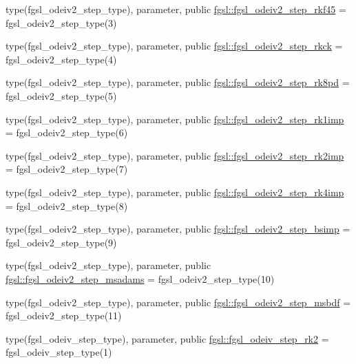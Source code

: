 \begin{DoxyCompactItemize}
\item 
type(fgsl\+\_\+odeiv2\+\_\+step\+\_\+type), parameter, public \hyperlink{namespacefgsl_a9ddf77505b3bd58dea1832c7d57cb566}{fgsl\+::fgsl\+\_\+odeiv2\+\_\+step\+\_\+rkf45} = fgsl\+\_\+odeiv2\+\_\+step\+\_\+type(3)
\item 
type(fgsl\+\_\+odeiv2\+\_\+step\+\_\+type), parameter, public \hyperlink{namespacefgsl_a18b4edbca94c0c9d60fbadc94d1d4964}{fgsl\+::fgsl\+\_\+odeiv2\+\_\+step\+\_\+rkck} = fgsl\+\_\+odeiv2\+\_\+step\+\_\+type(4)
\item 
type(fgsl\+\_\+odeiv2\+\_\+step\+\_\+type), parameter, public \hyperlink{namespacefgsl_aa7c82f7503be3be3ab81991a3e8eb719}{fgsl\+::fgsl\+\_\+odeiv2\+\_\+step\+\_\+rk8pd} = fgsl\+\_\+odeiv2\+\_\+step\+\_\+type(5)
\item 
type(fgsl\+\_\+odeiv2\+\_\+step\+\_\+type), parameter, public \hyperlink{namespacefgsl_ae903b3c5e98a84868123fcf7f45cdf11}{fgsl\+::fgsl\+\_\+odeiv2\+\_\+step\+\_\+rk1imp} = fgsl\+\_\+odeiv2\+\_\+step\+\_\+type(6)
\item 
type(fgsl\+\_\+odeiv2\+\_\+step\+\_\+type), parameter, public \hyperlink{namespacefgsl_a7b4cc51dc91d507009b26f542f372bbd}{fgsl\+::fgsl\+\_\+odeiv2\+\_\+step\+\_\+rk2imp} = fgsl\+\_\+odeiv2\+\_\+step\+\_\+type(7)
\item 
type(fgsl\+\_\+odeiv2\+\_\+step\+\_\+type), parameter, public \hyperlink{namespacefgsl_ac791c6691e1ebeae5e10c234a26737df}{fgsl\+::fgsl\+\_\+odeiv2\+\_\+step\+\_\+rk4imp} = fgsl\+\_\+odeiv2\+\_\+step\+\_\+type(8)
\item 
type(fgsl\+\_\+odeiv2\+\_\+step\+\_\+type), parameter, public \hyperlink{namespacefgsl_a6c2cfecdf8c9901ed22feb4c9fdef384}{fgsl\+::fgsl\+\_\+odeiv2\+\_\+step\+\_\+bsimp} = fgsl\+\_\+odeiv2\+\_\+step\+\_\+type(9)
\item 
type(fgsl\+\_\+odeiv2\+\_\+step\+\_\+type), parameter, public \hyperlink{namespacefgsl_a2cdba04e438cd75d8a78612215dcc5bc}{fgsl\+::fgsl\+\_\+odeiv2\+\_\+step\+\_\+msadams} = fgsl\+\_\+odeiv2\+\_\+step\+\_\+type(10)
\item 
type(fgsl\+\_\+odeiv2\+\_\+step\+\_\+type), parameter, public \hyperlink{namespacefgsl_a125bb5f7c78cd4dda6b7a957e8867653}{fgsl\+::fgsl\+\_\+odeiv2\+\_\+step\+\_\+msbdf} = fgsl\+\_\+odeiv2\+\_\+step\+\_\+type(11)
\item 
type(fgsl\+\_\+odeiv\+\_\+step\+\_\+type), parameter, public \hyperlink{namespacefgsl_aa58b6af1260738ff3a83d7910e978b32}{fgsl\+::fgsl\+\_\+odeiv\+\_\+step\+\_\+rk2} = fgsl\+\_\+odeiv\+\_\+step\+\_\+type(1)
\item 

\end{DoxyCompactItemize}
